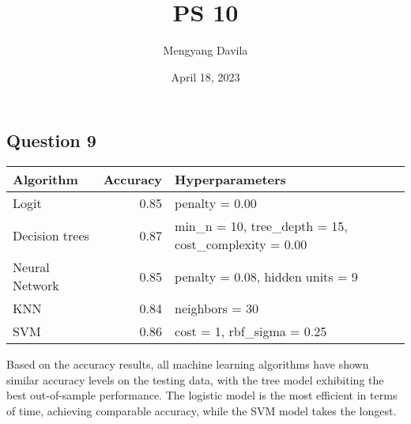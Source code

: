 \documentclass{article}
\title{PS 10}
\author{Mengyang Davila}
\date{April 18, 2023}
\begin{document}
\maketitle

\subsection*{Question 9}

\begin{table}[h]
	\centering
\begin{tabular}{|l|r|l|}
	\hline
	Algorithm & Accuracy & Hyperparameters\\
	\hline
	Logit & 0.85 & penalty = 0.00\\
	\hline
	Decision trees  & 0.87 & min\_n = 10, tree\_depth = 15, cost\_complexity = 0.00 \\
	\hline
	Neural Network & 0.85 & penalty = 0.08, hidden units = 9\\
	\hline
	KNN & 0.84 & neighbors = 30\\
	\hline
	SVM & 0.86 & cost = 1, rbf\_sigma = 0.25\\
	\hline
\end{tabular}
\end{table}

Based on the accuracy results, all machine learning algorithms have shown similar accuracy levels on the testing data, with the tree model exhibiting the best out-of-sample performance. The logistic model is the most efficient in terms of time, achieving comparable accuracy, while the SVM model takes the longest.
\end{document}
